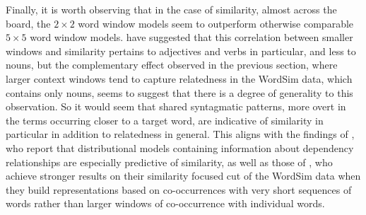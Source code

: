 
Finally, it is worth observing that in the case of similarity, almost across the board, the $2 \times 2$ word window models seem to outperform otherwise comparable $5 \times 5$ word window models.  \cite{HillEA2015} have suggested that this correlation between smaller windows and similarity pertains to adjectives and verbs in particular, and less to nouns, but the complementary effect observed in the previous section, where larger context windows tend to capture relatedness in the WordSim data, which contains only nouns, seems to suggest that there is a degree of generality to this observation.  So it would seem that shared syntagmatic patterns, more overt in the terms occurring closer to a target word, are indicative of similarity in particular in addition to relatedness in general.  This aligns with the findings of \cite{KielaEA2014}, who report that distributional models containing information about dependency relationships are especially predictive of similarity, as well as those of \cite{AgirreEA2009}, who achieve stronger results on their similarity focused cut of the WordSim data when they build representations based on co-occurrences with very short sequences of words rather than larger windows of co-occurrence with individual words.

